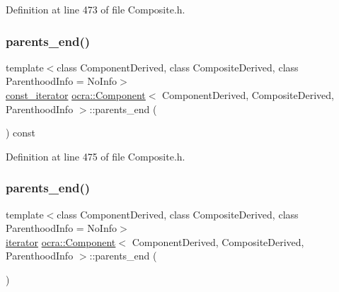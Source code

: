 Definition at line 473 of file Composite.\+h.

\hypertarget{classocra_1_1Component_a3d7c4568dc83d08b014ae7b8d0119e70}{}\label{classocra_1_1Component_a3d7c4568dc83d08b014ae7b8d0119e70} 
\subsubsection{\texorpdfstring{parents\+\_\+end()}{parents\_end()}\hspace{0.1cm}{\footnotesize\ttfamily [1/2]}}
{\footnotesize\ttfamily template$<$class Component\+Derived, class Composite\+Derived, class Parenthood\+Info = No\+Info$>$ \\
\hyperlink{classocra_1_1Component_a6271631f04d2911e4369d1288074eebb}{const\+\_\+iterator} \hyperlink{classocra_1_1Component}{ocra\+::\+Component}$<$ Component\+Derived, Composite\+Derived, Parenthood\+Info $>$\+::parents\+\_\+end (\begin{DoxyParamCaption}{ }\end{DoxyParamCaption}) const\hspace{0.3cm}{\ttfamily [inline]}}



Definition at line 475 of file Composite.\+h.

\hypertarget{classocra_1_1Component_a15dc70cd778a884fd6aa27771189d091}{}\label{classocra_1_1Component_a15dc70cd778a884fd6aa27771189d091} 
\subsubsection{\texorpdfstring{parents\+\_\+end()}{parents\_end()}\hspace{0.1cm}{\footnotesize\ttfamily [2/2]}}
{\footnotesize\ttfamily template$<$class Component\+Derived, class Composite\+Derived, class Parenthood\+Info = No\+Info$>$ \\
\hyperlink{classocra_1_1Component_a9b76b63c3248ec96dfdaca00d712c1c9}{iterator} \hyperlink{classocra_1_1Component}{ocra\+::\+Component}$<$ Component\+Derived, Composite\+Derived, Parenthood\+Info $>$\+::parents\+\_\+end (\begin{DoxyParamCaption}{ }\end{DoxyParamCaption})\hspace{0.3cm}{\ttfamily [inline]}}




